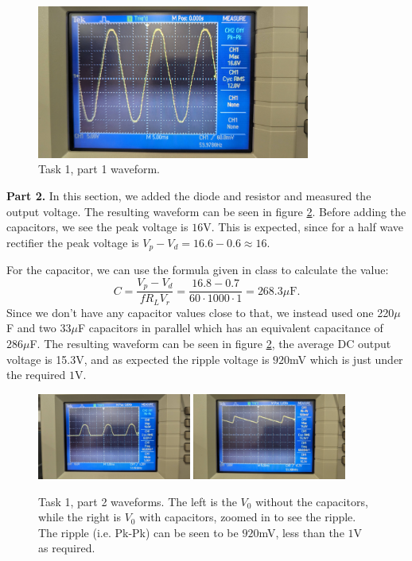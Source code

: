 \documentclass[letterpaper, reqno,11pt]{article}
\begin{document}
\begin{figure}[htpb]
        \centering
        \includegraphics[width=0.8\textwidth]{lab1/t1p1}
        \caption{Task 1, part 1 waveform.}
        \label{fig:t1p1}
\end{figure}

{\medskip\noindent\bf Part 2.} In this section, we added the diode and resistor and measured the output voltage. The resulting waveform can be seen in figure \ref{fig:t1p2}. Before adding the capacitors, we see the peak voltage is $16$V. This is expected, since for a half wave rectifier the peak voltage is $V_p-V_d=16.6-0.6\approx 16$.

For the capacitor, we can use the formula given in class to calculate the value:
\[
C = \frac{V_p-V_d}{fR_LV_r}=\frac{16.8-0.7}{60\cdot 1000\cdot 1}=268.3\mu\text{F}
.\]
Since we don't have any capacitor values close to that, we instead used one 220$\mu$F and two $33\mu$F capacitors in parallel which has an equivalent capacitance of $286\mu$F. The resulting waveform can be seen in figure \ref{fig:t1p2}, the average DC output voltage is 15.3V, and as expected the ripple voltage is $920$mV which is just under the required $1$V.

\begin{figure}[htpb]
        \centering
        \includegraphics[width=0.45\textwidth]{lab1/t1p2b}
        \includegraphics[width=0.45\textwidth]{lab1/t1p2c}
        \caption{Task 1, part 2 waveforms. The left is the $V_0$ without the capacitors, while the right is $V_0$ with capacitors, zoomed in to see the ripple. The ripple (i.e. Pk-Pk) can be seen to be $920$mV, less than the $1$V as required.}
        \label{fig:t1p2}
\end{figure}
\end{document}
